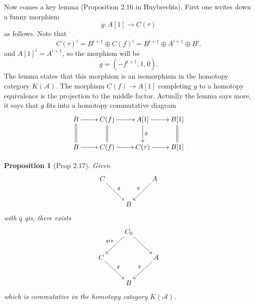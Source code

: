 \documentclass[12pt]{article}
\theoremstyle{plain}
\newtheorem{prop}[thm]{Proposition}
\theoremstyle{definition}
\numberwithin{equation}{section}
\newcommand{\CA}{\mathcal{A}}
\begin{document}
Now comes a key lemma (Proposition 2.16 in Huybrechts). First one writes down a funny morphism
\[
g : A[1] \rightarrow C(\tau)
\]
as follows. Note that
\[
C(\tau)^i = B^{i+1} \oplus C(f)^i =  B^{i+1} \oplus A^{i+1} \oplus B^i.
\]
and $A[1]^i = A^{i+1}$, so the morphism will be
\[
g = (-f^{i+1}, 1, 0).
\]
The lemma states that this morphism is an isomorphism in the homotopy category $K(\CA)$. The morphism $C(f) \rightarrow A[1]$ completing $g$ to a homotopy equivalence is the projection to the middle factor. Actually the lemma says more, it says that $g$ fits into a homotopy commutative diagram
\begin{align*}
\xymatrix{
B \ar@{->}[r]_{} \ar@{=}[d] & C(f) \ar@{->}[r]_{} \ar@{=}[d] & A[1] \ar@{->}[r]_{} \ar@{->}[d]^{g} & B[1] \ar@{=}[d] \\
%
B \ar@{->}[r]_{} & C(f) \ar@{->}[r]_{} & C(\tau) \ar@{->}[r]_{} & B[1]
}
\end{align*}


\begin{prop}[{Prop 2.17}]
Given
\begin{align*}
\xymatrix{
& C \ar@{->}[dr]^{g} &  & A \ar@{->}[dl]_{q} & \\
%
 & & B & &  \\
}
\end{align*}
with $q$ qis, there exists
\begin{align*}
\xymatrix{
 & & C_0 \ar@{->}[dl]_{qis} \ar@{->}[dr]^{.} &  \\
%
& C \ar@{->}[dr]^{g} &  & A \ar@{->}[dl]_{q} & \\
%
 & & B & &  \\
}
\end{align*}
which is commutative in the homotopy category $K(\CA)$.
\end{prop}
\end{document}
